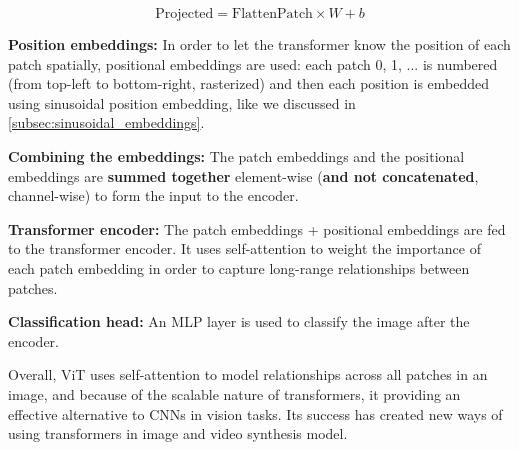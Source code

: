 \[ \text{Projected} = \text{FlattenPatch} \times W + b \]

\textbf{Position embeddings:} In order to let the transformer know the position of each patch spatially, positional embeddings are used: each patch 0, 1, ... is numbered (from top-left to bottom-right, rasterized) and then each position is embedded using sinusoidal position embedding, like we discussed in \ref{subsec:sinusoidal_embeddings}.

\textbf{Combining the embeddings:} The patch embeddings and the positional embeddings are \textbf{summed together} element-wise (\textbf{and not concatenated}, channel-wise) to form the input to the encoder.

\textbf{Transformer encoder:} The patch embeddings + positional embeddings are fed to the transformer encoder. It uses self-attention to weight the importance of each patch embedding in order to capture long-range relationships between patches.

\textbf{Classification head:} An MLP layer is used to classify the image after the encoder.

Overall, ViT uses self-attention to model relationships across all patches in an image, and because of the scalable nature of transformers, it providing an effective alternative to CNNs in vision tasks. Its success has created new ways of using transformers in image and video synthesis model.
